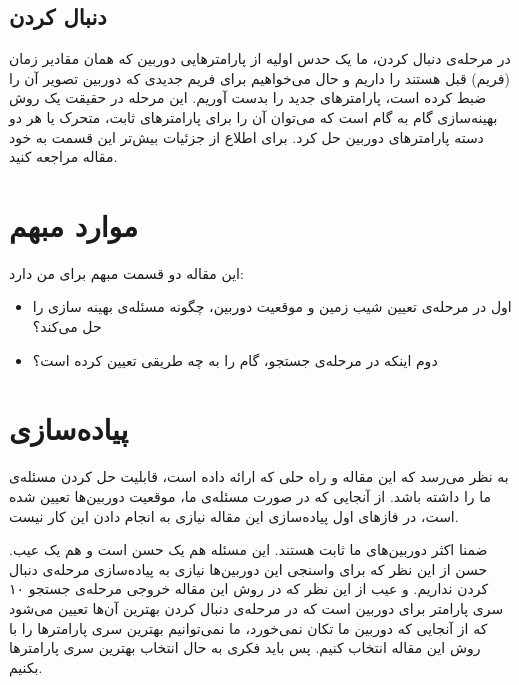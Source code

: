 \documentclass{report}
\renewcommand{\baselinestretch}{1.8}
\begin{document}
\subsection{دنبال کردن}
در مرحله‌ی دنبال کردن، ما یک حدس اولیه از پارامترهایی دوربین که همان مقادیر زمان (فریم) قبل هستند را داریم و حال می‌خواهیم برای فریم جدیدی که دوربین تصویر آن را ضبط کرده است، پارامترهای جدید را بدست آوریم. این مرحله در حقیقت یک روش بهینه‌سازی گام به گام  است که می‌توان آن را برای پارامترهای ثابت، متحرک یا هر دو دسته پارامترهای دوربین حل کرد. برای اطلاع از جزئیات بیش‌تر این قسمت به خود مقاله مراجعه کنید.
\section{موارد مبهم}
این مقاله دو قسمت مبهم برای من دارد:
\begin{itemize}
\item
اول در مرحله‌ی تعیین شیب زمین و موقعیت دوربین، چگونه مسئله‌ی بهینه سازی را حل می‌کند؟
\item
دوم اینکه در مرحله‌ی جستجو، گام را به چه طریقی تعیین کرده است؟
\end{itemize}
\section{پیاده‌سازی}
به نظر می‌رسد که این مقاله و راه حلی که ارائه داده است، قابلیت حل کردن مسئله‌ی ما را داشته باشد. از آنجایی که در صورت مسئله‌ی ما، موقعیت دوربین‌ها تعیین شده است، در فازهای اول پیاده‌سازی این مقاله نیازی به انجام دادن این کار نیست.

ضمنا اکثر دوربین‌های ما ثابت هستند. این مسئله هم یک حسن است و هم یک عیب. حسن از این نظر که برای واسنجی این دوربین‌ها نیازی به پیاده‌سازی مرحله‌ی دنبال کردن نداریم. و عیب از این نظر که در روش این مقاله خروجی مرحله‌ی جستجو ۱۰ سری پارامتر برای دوربین است که در مرحله‌ی دنبال کردن بهترین آن‌ها تعیین می‌شود که از آنجایی که دوربین ما تکان نمی‌خورد، ما نمی‌توانیم بهترین سری پارامترها را با روش این مقاله انتخاب کنیم. پس باید فکری به حال انتخاب بهترین سری پارامترها بکنیم.

\renewcommand{\baselinestretch}{1}
\renewcommand*{\refname}{\section{منابع}}

\begin{latin}
{}


\end{latin}
\end{document}
